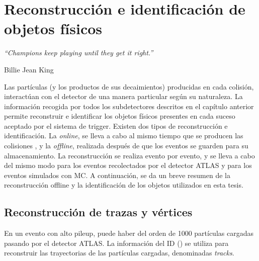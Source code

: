 \chapter{Reconstrucci\'on e identificaci\'on de objetos f\'isicos}
\label{ch:objects}
\epigraph{\emph{“Champions keep playing until they get it right.”}}{Billie Jean King}


Las partículas (y los productos de sus decaimientos) producidas en cada colisión, interactúan con el detector de una manera particular según su naturaleza. La información recogida por todos los subdetectores descritos en el capítulo anterior permite reconstruir e identificar los objetos físicos presentes en cada suceso aceptado por el sistema de trigger. Existen dos tipos de reconstrucción e identificación. La \textit{online}, se lleva a cabo al mismo tiempo que se producen las colisiones \pp, y la \textit{offline}, realizada después de que los eventos se guarden para su almacenamiento. La reconstrucción se realiza evento por evento, y se lleva a cabo del mismo modo para los eventos recolectados por el detector \ac{ATLAS} y para los eventos simulados con \acf{MC}. A continuación, se da un breve resumen de la reconstrucción offline y la identificación de los objetos utilizados en esta tesis.







\section{Reconstrucci\'on de trazas y v\'ertices}

En un evento con alto pileup, puede haber del orden de 1000 partículas cargadas pasando por el detector \ac{ATLAS}. La información del \ac{ID} (\Sect{\ref{subsec:atlas:atlas:id}}) se utiliza para reconstruir las trayectorias de las partículas cargadas, denominadas \textit{tracks}.

